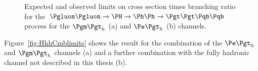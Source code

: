 \begin{figure}
\begin{center}

\end{center}
\caption{
Expected and observed limits on cross section times branching ratio for the
$\Pgluon\Pgluon\to\PH\to\Ph\Ph\to\Pgt\Pgt\Pqb\Pqb$ process for the $\mutau$ (a) and
$\etau$ (b) channels.}
\label{fig:Hhhlimits}
\end{figure} 

Figure~\ref{fig:HhhCmblimits} shows the result for the combination of the
$\etau$ and $\mutau$ channels (a) and a further combination with the fully
hadronic channel not described in this thesis (b).

